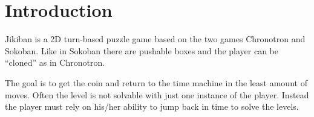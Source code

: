 \section{Introduction}
Jikiban is a 2D turn-based puzzle game based on the two games
Chronotron and Sokoban. Like in Sokoban there are pushable boxes and
the player can be ``cloned'' as in Chronotron.

The goal is to get the coin and return to the time machine in the
least amount of moves.  Often the level is not solvable with just one
instance of the player.  Instead the player must rely on his/her ability
to jump back in time to solve the levels.
